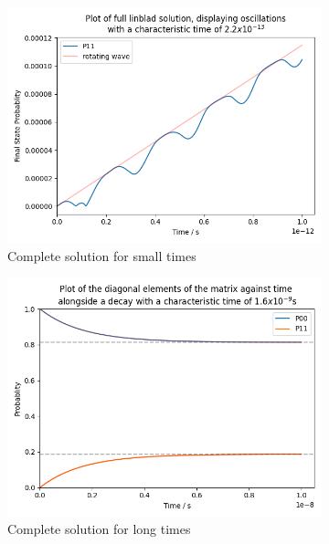 \begin{figure}[htbp]
    \centering
    \begin{subfigure}{0.45\linewidth}
        \centering
        \includegraphics[width =0.9 \linewidth]{Figures/Redfield/Plot of redfield solution short time.png}
        \caption{Complete solution for small times
        }\label{fig:redfield full solution short timescales}
    \end{subfigure}
    \hfill
    \begin{subfigure}{0.45\linewidth}
        \centering
        \includegraphics[width = 0.9\linewidth]{Figures/Redfield/Plot of redfield solution long time.png}
        \caption{Complete solution for long times
        }\label{fig:redfield full solution long timescales}
    \end{subfigure}
    \begin{subfigure}{0.45\linewidth}

\end{subfigure}
\end{figure}
